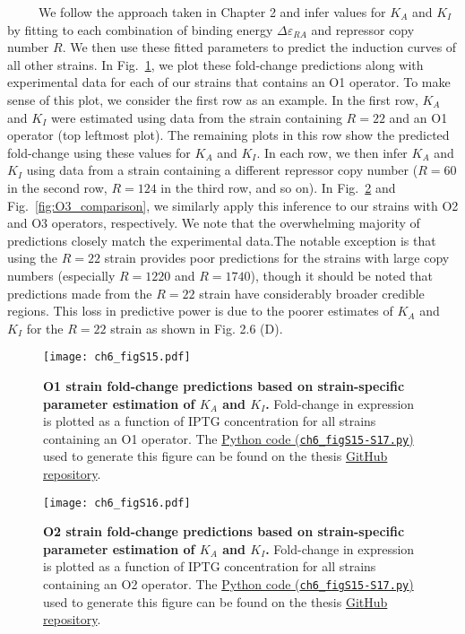\documentclass[12pt]{caltech_thesis}
\begin{document}
~~~~~We follow the approach taken in Chapter 2 and infer values for
\(K_A\) and \(K_I\) by fitting to each combination of binding energy
\(\Delta \varepsilon_{RA}\) and repressor copy number \(R\). We then use
these fitted parameters to predict the induction curves of all other
strains. In Fig.~\ref{fig:O1_comparison}, we plot these fold-change
predictions along with experimental data for each of our strains that
contains an O1 operator. To make sense of this plot, we consider the
first row as an example. In the first row, \(K_A\) and \(K_I\) were
estimated using data from the strain containing \(R=22\) and an O1
operator (top leftmost plot). The remaining plots in this row show the
predicted fold-change using these values for \(K_A\) and \(K_I\). In
each row, we then infer \(K_A\) and \(K_I\) using data from a strain
containing a different repressor copy number (\(R=60\) in the second
row, \(R=124\) in the third row, and so on). In
Fig.~\ref{fig:O2_comparison} and Fig.~\ref{fig:O3_comparison}, we
similarly apply this inference to our strains with O2 and O3 operators,
respectively. We note that the overwhelming majority of predictions
closely match the experimental data.The notable exception is that using
the \(R=22\) strain provides poor predictions for the strains with large
copy numbers (especially \(R=1220\) and \(R=1740\)), though it should be
noted that predictions made from the \(R=22\) strain have considerably
broader credible regions. This loss in predictive power is due to the
poorer estimates of \(K_A\) and \(K_I\) for the \(R=22\) strain as shown
in Fig. 2.6 (D).

\hypertarget{fig:O1_comparison}{%
\begin{figure}
\centering
\texttt{[image: ch6\_figS15.pdf]}
\caption[{O1 strain fold-change predictions based on strain-specific
parameter estimation of \(K_A\) and \(K_I\).}]{\textbf{O1 strain
fold-change predictions based on strain-specific parameter estimation of
\(K_A\) and \(K_I\).} Fold-change in expression is plotted as a function
of IPTG concentration for all strains containing an O1 operator. The
\href{https://github.com/gchure/phd/blob/master/src/chapter_06/code/ch6_figS15-17.py}{Python
code (\texttt{ch6\_figS15-S17.py})} used to generate this figure can be
found on the thesis \href{https://github.com/gchure/phd}{GitHub
repository}.}
\label{fig:O1_comparison}
\end{figure}
}

\hypertarget{fig:O2_comparison}{%
\begin{figure}
\centering
\texttt{[image: ch6\_figS16.pdf]}
\caption[{O2 strain fold-change predictions based on strain-specific
parameter estimation of \(K_A\) and \(K_I\).}]{\textbf{O2 strain
fold-change predictions based on strain-specific parameter estimation of
\(K_A\) and \(K_I\).} Fold-change in expression is plotted as a function
of IPTG concentration for all strains containing an O2 operator. The
\href{https://github.com/gchure/phd/blob/master/src/chapter_06/code/ch6_figS15-17.py}{Python
code (\texttt{ch6\_figS15-S17.py})} used to generate this figure can be
found on the thesis \href{https://github.com/gchure/phd}{GitHub
repository}.}
\label{fig:O2_comparison}
\end{figure}
}
\end{document}
